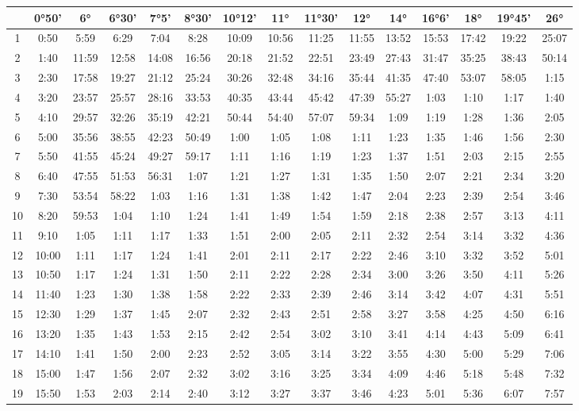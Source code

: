 \begin{scriptsize}\begin{tabular}{c | c | c | c | c | c | c | c | c | c | c | c | c | c | c}
		\space&0°50'&6°&6°30'&7°5'&8°30'&10°12'&11°&11°30'&12°&14°&16°6'&18°&19°45'&26°\\\hline
		1&0:50&5:59&6:29&7:04&8:28&10:09&10:56&11:25&11:55&13:52&15:53&17:42&19:22&25:07\\\hline
		2&1:40&11:59&12:58&14:08&16:56&20:18&21:52&22:51&23:49&27:43&31:47&35:25&38:43&50:14\\\hline
		3&2:30&17:58&19:27&21:12&25:24&30:26&32:48&34:16&35:44&41:35&47:40&53:07&58:05&1:15\\\hline
		4&3:20&23:57&25:57&28:16&33:53&40:35&43:44&45:42&47:39&55:27&1:03&1:10&1:17&1:40\\\hline
		5&4:10&29:57&32:26&35:19&42:21&50:44&54:40&57:07&59:34&1:09&1:19&1:28&1:36&2:05\\\hline
		6&5:00&35:56&38:55&42:23&50:49&1:00&1:05&1:08&1:11&1:23&1:35&1:46&1:56&2:30\\\hline
		7&5:50&41:55&45:24&49:27&59:17&1:11&1:16&1:19&1:23&1:37&1:51&2:03&2:15&2:55\\\hline
		8&6:40&47:55&51:53&56:31&1:07&1:21&1:27&1:31&1:35&1:50&2:07&2:21&2:34&3:20\\\hline
		9&7:30&53:54&58:22&1:03&1:16&1:31&1:38&1:42&1:47&2:04&2:23&2:39&2:54&3:46\\\hline
		10&8:20&59:53&1:04&1:10&1:24&1:41&1:49&1:54&1:59&2:18&2:38&2:57&3:13&4:11\\\hline
		11&9:10&1:05&1:11&1:17&1:33&1:51&2:00&2:05&2:11&2:32&2:54&3:14&3:32&4:36\\\hline
		12&10:00&1:11&1:17&1:24&1:41&2:01&2:11&2:17&2:22&2:46&3:10&3:32&3:52&5:01\\\hline
		13&10:50&1:17&1:24&1:31&1:50&2:11&2:22&2:28&2:34&3:00&3:26&3:50&4:11&5:26\\\hline
		14&11:40&1:23&1:30&1:38&1:58&2:22&2:33&2:39&2:46&3:14&3:42&4:07&4:31&5:51\\\hline
		15&12:30&1:29&1:37&1:45&2:07&2:32&2:43&2:51&2:58&3:27&3:58&4:25&4:50&6:16\\\hline
		16&13:20&1:35&1:43&1:53&2:15&2:42&2:54&3:02&3:10&3:41&4:14&4:43&5:09&6:41\\\hline
		17&14:10&1:41&1:50&2:00&2:23&2:52&3:05&3:14&3:22&3:55&4:30&5:00&5:29&7:06\\\hline
		18&15:00&1:47&1:56&2:07&2:32&3:02&3:16&3:25&3:34&4:09&4:46&5:18&5:48&7:32\\\hline
		19&15:50&1:53&2:03&2:14&2:40&3:12&3:27&3:37&3:46&4:23&5:01&5:36&6:07&7:57\\\hline

\end{tabular}
\end{scriptsize}
